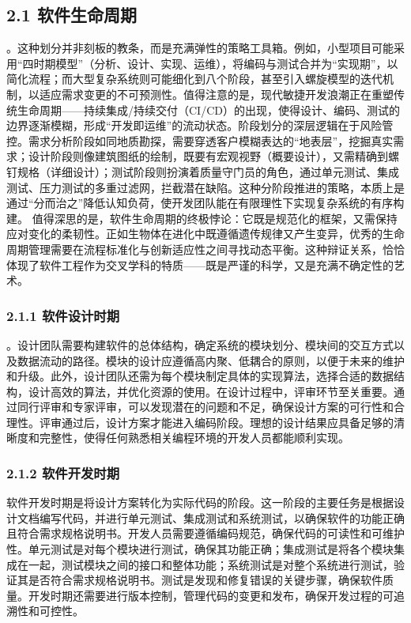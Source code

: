 \subsection{2.1 软件生命周期}\label{ux8f6fux4ef6ux751fux547dux5468ux671f}
。这种划分并非刻板的教条，而是充满弹性的策略工具箱。例如，小型项目可能采用``四时期模型''（分析、设计、实现、运维），将编码与测试合并为``实现期''，以简化流程；而大型复杂系统则可能细化到八个阶段，甚至引入螺旋模型的迭代机制，以适应需求变更的不可预测性。值得注意的是，现代敏捷开发浪潮正在重塑传统生命周期------持续集成/持续交付（CI/CD）的出现，使得设计、编码、测试的边界逐渐模糊，形成``开发即运维''的流动状态。阶段划分的深层逻辑在于风险管控。需求分析阶段如同地质勘探，需要穿透客户模糊表达的``地表层''，挖掘真实需求；设计阶段则像建筑图纸的绘制，既要有宏观视野（概要设计），又需精确到螺钉规格（详细设计）；测试阶段则扮演着质量守门员的角色，通过单元测试、集成测试、压力测试的多重过滤网，拦截潜在缺陷。这种分阶段推进的策略，本质上是通过``分而治之''降低认知负荷，使开发团队能在有限理性下实现复杂系统的有序构建。
值得深思的是，软件生命周期的终极悖论：它既是规范化的框架，又需保持应对变化的柔韧性。正如生物体在进化中既遵循遗传规律又产生变异，优秀的生命周期管理需要在流程标准化与创新适应性之间寻找动态平衡。这种辩证关系，恰恰体现了软件工程作为交叉学科的特质------既是严谨的科学，又是充满不确定性的艺术。
\subsubsection{2.1.1 软件设计时期}\label{ux8f6fux4ef6ux8bbeux8ba1ux65f6ux671f}
。设计团队需要构建软件的总体结构，确定系统的模块划分、模块间的交互方式以及数据流动的路径。模块的设计应遵循高内聚、低耦合的原则，以便于未来的维护和升级。此外，设计团队还需为每个模块制定具体的实现算法，选择合适的数据结构，设计高效的算法，并优化资源的使用。在设计过程中，评审环节至关重要。通过同行评审和专家评审，可以发现潜在的问题和不足，确保设计方案的可行性和合理性。评审通过后，设计方案才能进入编码阶段。理想的设计结果应具备足够的清晰度和完整性，使得任何熟悉相关编程环境的开发人员都能顺利实现。
\subsubsection{2.1.2 软件开发时期}\label{ux8f6fux4ef6ux5f00ux53d1ux65f6ux671f}
软件开发时期是将设计方案转化为实际代码的阶段。这一阶段的主要任务是根据设计文档编写代码，并进行单元测试、集成测试和系统测试，以确保软件的功能正确且符合需求规格说明书。开发人员需要遵循编码规范，确保代码的可读性和可维护性。单元测试是对每个模块进行测试，确保其功能正确；集成测试是将各个模块集成在一起，测试模块之间的接口和整体功能；系统测试是对整个系统进行测试，验证其是否符合需求规格说明书。测试是发现和修复错误的关键步骤，确保软件质量。开发时期还需要进行版本控制，管理代码的变更和发布，确保开发过程的可追溯性和可控性。
